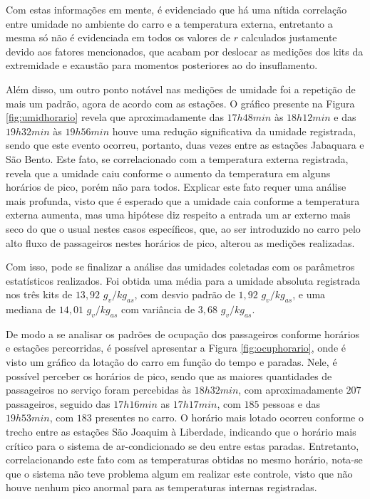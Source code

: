 \documentclass[acronym,symbols,table]{fei}
\begin{document}
Com estas informações em mente, é evidenciado que há uma nítida correlação entre umidade no ambiente do carro e a temperatura externa, entretanto a mesma só não é evidenciada em todos os valores de $r$ calculados justamente devido aos fatores mencionados, que acabam por deslocar as medições dos kits da extremidade e exaustão para momentos posteriores ao do insuflamento.

Além disso, um outro ponto notável nas medições de umidade foi a repetição de mais um padrão, agora de acordo com as estações. O gráfico presente na Figura \ref{fig:umidhorario} revela que aproximadamente das $17h48min$ às $18h12min$ e das $19h32min$ às $19h56min$ houve uma redução significativa da umidade registrada, sendo que este evento ocorreu, portanto, duas vezes entre as estações Jabaquara e São Bento. Este fato, se correlacionado com a temperatura externa registrada, revela que a umidade caiu conforme o aumento da temperatura em alguns horários de pico, porém não para todos. Explicar este fato requer uma análise mais profunda, visto que é esperado que a umidade caia conforme a temperatura externa aumenta, mas uma hipótese diz respeito a entrada um ar externo mais seco do que o usual nestes casos específicos, que, ao ser introduzido no carro pelo alto fluxo de passageiros nestes horários de pico, alterou as medições realizadas.

Com isso, pode se finalizar a análise das umidades coletadas com os parâmetros estatísticos realizados. Foi obtida uma média para a umidade absoluta registrada nos três kits de $13,92$ $g_{v}/kg_{as}$, com desvio padrão de $1,92$ $g_{v}/kg_{as}$, e uma mediana de $14,01$ $g_{v}/kg_{as}$ com variância de $3,68$ $g_{v}/kg_{as}$.

De modo a se analisar os padrões de ocupação dos passageiros conforme horários e estações percorridas, é possível apresentar a Figura \ref{fig:ocuphorario}, onde é visto um gráfico da lotação do carro em função do tempo e paradas. Nele, é possível perceber os horários de pico, sendo que as maiores quantidades de passageiros no serviço foram percebidas às $18h32min$, com aproximadamente $207$ passageiros, seguido das $17h16min$ as $17h17min$, com $185$ pessoas e das $19h53min$, com $183$ presentes no carro. O horário mais lotado ocorreu conforme o trecho entre as estações São Joaquim à Liberdade, indicando que o horário mais crítico para o sistema de ar-condicionado se deu entre estas paradas. Entretanto, correlacionando este fato com as temperaturas obtidas no mesmo horário, nota-se que o sistema não teve problema algum em realizar este controle, visto que não houve nenhum pico anormal para as temperaturas internas registradas.
\end{document}
